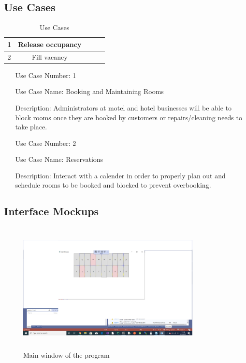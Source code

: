 \documentclass[10pt,conference,onecolumn,compsoc]{IEEEtran}
\begin{document}
\subsection{Use Cases}

\begin{table}
\centering
\begin{tabular}{|c|c|c|c|c|}
\hline
1 & Release occupancy\\
\hline \hline
2 & Fill vacancy\\
\hline

\end{tabular}
\caption{Use Cases}
\label{tab:useCaseIndex}
\end{table}


\begin{itemize}
\item[Use Case Number:] 1
\item[Use Case Name:] Booking and Maintaining Rooms
\item[Description:] Administrators at motel and hotel businesses will be able to block rooms once they are booked by customers or repairs/cleaning needs to take place.

\item[Use Case Number:] 2
\item[Use Case Name:] Reservations
\item[Description:] Interact with a calender in order to properly plan out and schedule rooms to be booked and blocked to prevent overbooking.
\end{itemize}

\subsection{Interface Mockups}
\begin{figure}[ht!]
\includegraphics[height=250px, width=350px]{GUI.png}
\caption{Main window of the program}
\label{Interface}
\end{figure}
\end{document}
